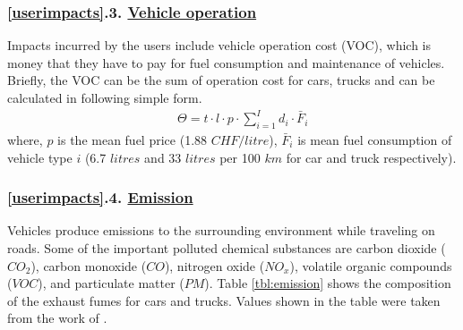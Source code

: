 \documentclass[a4paper,3p,times,authoryear]{elsarticle}
\begin{document}
\subsubsection*{\ref{userimpacts}.3. \underline{Vehicle operation}}
Impacts incurred by the users include vehicle operation cost (VOC), which is money that they have to pay for fuel consumption and maintenance of vehicles. Briefly, the VOC can be the sum of operation cost for cars, trucks and can be calculated in following simple form.
\begin{eqnarray}
      && \Theta= t\cdot l \cdot p \cdot \sum_{i=1}^{I} d_i \cdot \bar F_i \label{vocimpact}
\end{eqnarray}
where, $p$ is the mean fuel price (1.88 $CHF/litre$), $\bar F_i$ is mean fuel consumption of vehicle type $i$ (6.7 $litres$ and 33 $litres$ per 100 $km$ for car and truck respectively). 
\subsubsection*{\ref{userimpacts}.4. \underline{Emission}}
Vehicles produce emissions to the surrounding environment while traveling on roads. Some of the important polluted chemical substances are carbon dioxide ($CO_2$), carbon monoxide ($CO$), nitrogen oxide ($NO_x$), volatile organic compounds ($VOC$), and particulate matter ($PM$). Table \ref{tbl:emission} shows the composition of the exhaust fumes for cars and trucks. Values shown in the table were taken from the work of \cite{Geringer2004}.
\end{document}
